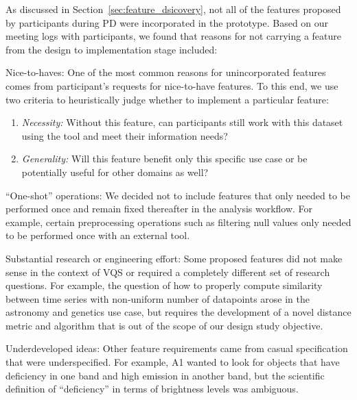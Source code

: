  \npar As discussed in Section~\ref{sec:feature_dsicovery}, not all of the features proposed by participants during PD were incorporated in the \zvpp prototype. Based on our meeting logs with participants, we found that reasons for not carrying a feature from the design to implementation stage included:
 \begin{denselist} %
 \item Nice-to-haves: One of the most common reasons for unincorporated features comes from participant's requests for nice-to-have features. To this end, we use two criteria to heuristically judge whether to implement a particular feature:
 \begin{enumerate}[leftmargin=*]
 \item \textit{Necessity:} Without this feature, can participants still work with this dataset using the tool and meet their information needs?
 \item \textit{Generality:} Will this feature benefit only this specific use case or be potentially useful for other domains as well?
 \end{enumerate}
 \item ``One-shot'' operations: We decided not to include features that only needed to be performed once and remain fixed thereafter in the analysis workflow. For example, certain preprocessing operations such as filtering null values only needed to be performed once with an external tool.
 \item Substantial research or engineering effort: Some proposed features did not make sense in the context of VQS or required a completely different set of research questions. For example, the question of how to properly compute similarity between time series with non-uniform number of datapoints arose in the astronomy and genetics use case, but requires the development of a novel distance metric and algorithm that is out of the scope of our design study objective. %
 \item Underdeveloped ideas: Other feature requirements came from casual specification that were underspecified. For example, A1 wanted to look for objects that have deficiency in one band and high emission in another band, but the scientific definition of ``deficiency'' in terms of brightness levels was ambiguous.
 \end{denselist}
